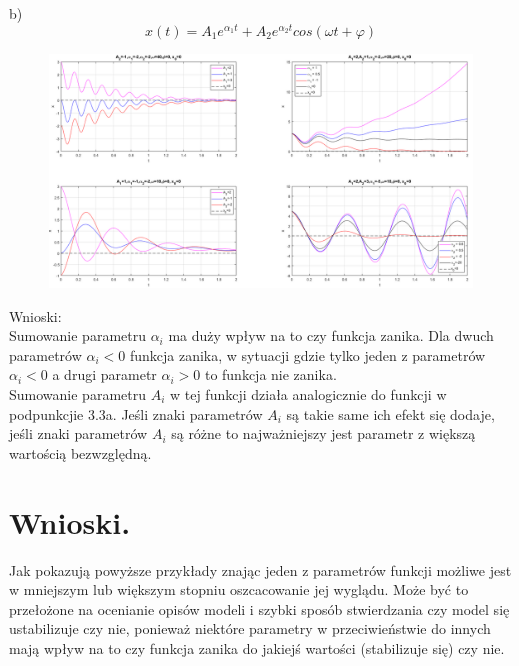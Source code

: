 \documentclass{article}
\begin{document}
\newpage
b)
$$
x(t)=A_1e^{\alpha_1 t}+A_2e^{\alpha_2 t}cos(\omega t+\varphi)
$$
\begin{figure}[h!]
    \centering
    \includegraphics[width=1\textwidth]{d_graphs_wersja2.png}
    \label{fig:my_label}
\end{figure}
\begin{flushleft}
Wnioski:\\
Sumowanie parametru $\alpha_i$ ma duży wpływ na to czy funkcja zanika. Dla dwuch parametrów $\alpha_i < 0 $ funkcja zanika, w sytuacji gdzie tylko jeden z parametrów $\alpha_i < 0$ a drugi parametr $\alpha_i > 0$ to funkcja nie zanika. \\
Sumowanie parametru $A_i$ w tej funkcji działa analogicznie do funkcji w podpunkcjie 3.3a. Jeśli znaki parametrów $A_i$ są takie same ich efekt się 
dodaje, jeśli znaki parametrów $A_i$ są różne to najważniejszy jest parametr z większą wartością bezwzględną.\\
\end{flushleft}


\newpage
\section{Wnioski.}
Jak pokazują powyższe przykłady znając jeden z parametrów funkcji możliwe jest w mniejszym lub większym stopniu oszcacowanie jej wyglądu. Może być to przełożone na ocenianie opisów modeli i szybki sposób stwierdzania czy model się ustabilizuje czy nie, ponieważ niektóre parametry w przeciwieństwie do innych mają wpływ na to czy funkcja zanika do jakiejś wartości (stabilizuje się) czy nie. 
\end{document}
